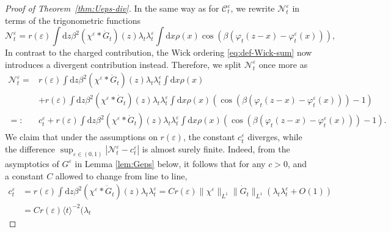 \documentclass[11pt, a4paper]{scrartcl}
\numberwithin{equation}{section}
\theoremstyle{plain}
\theoremstyle{remark}
\newcommand{\backassign}{=:}
\newcommand{\mathd}{\mathrm{d}}
\newcommand{\tmtextbf}[1]{\text{{\bfseries{#1}}}}
\begin{document}
\begin{proof}[Proof of Theorem~\ref{thm:Ueps-div}]
	\tmtextbf{($\mathcal{N}^{\varepsilon}_t$).} In the same way as for
	$\mathcal{C}^{\varepsilon}_t$, we rewrite $\mathcal{N}^{\varepsilon}_t$ in
	terms of the trigonometric functions
	\[ \mathcal{N}^{\varepsilon}_t = r (\varepsilon) \int \mathd z \beta^2
		(\chi^{\varepsilon} \ast \dot{G}_t ) (z) \lambda_t
		\lambda_t^{\varepsilon} \int \mathd x \rho (x) \cos (\beta (\varphi_t (z
				- x) - \varphi_t^{\varepsilon} (x))), \]
	In contrast to the charged contribution, the Wick ordering
	\eqref{eq:def-Wick-sum} now introduces a divergent contribution instead.
	Therefore, we split $\mathcal{N}^{\varepsilon}_t$ once more as
	\[ \begin{aligned}
			\mathcal{N}^{\varepsilon}_t = & r (\varepsilon) \int \mathd z \beta^2
			(\chi^{\varepsilon} \ast \dot{G}_t ) (z) \lambda_t
			\lambda_t^{\varepsilon}  \int \mathd x \rho (x)                                                  \\
			                              & + r (\varepsilon) \int \mathd z \beta^2 (\chi^{\varepsilon} \ast
			\dot{G}_t ) (z) \lambda_t \lambda_t^{\varepsilon} \int \mathd x \rho
			(x) (\cos (\beta (\varphi_t (z - x) - \varphi_t^{\varepsilon} (x))) -
			1)                                                                                               \\
			\backassign                   & c^{\varepsilon}_t + r (\varepsilon) \int \mathd z
			\beta^2 (\chi^{\varepsilon} \ast \dot{G}_t ) (z) \lambda_t
			\lambda_t^{\varepsilon} \int \mathd x \rho (x) (\cos (\beta (\varphi_t
						(z - x) - \varphi_t^{\varepsilon} (x))) - 1) .
		\end{aligned} \]
	We claim that under the assumptions on $r (\varepsilon)$, the constant
	$c^{\varepsilon}_t$ diverges, while the difference $\sup_{\varepsilon \in (0, 1)} |
		\mathcal{N}^{\varepsilon}_t - c_t^{\varepsilon} |$ is almost surely finite.
	Indeed, from the asymptotics of $G^{\varepsilon}$ in Lemma \ref{lem:Geps}
	below, it follows that for any $c > 0$, and a constant $C$ allowed to change
	from line to line,
	\[ \begin{aligned}
			c_t^{\varepsilon} & = r (\varepsilon) \int \mathd z \beta^2
			(\chi^{\varepsilon} \ast \dot{G}_t ) (z) \lambda_t
			\lambda_t^{\varepsilon} = Cr (\varepsilon) \| \chi^{\varepsilon}
			\|_{L^1} \| \dot{G}_t \|_{L^1}  (\lambda_t \lambda_t^{\varepsilon} + O
			(1))                                                                       \\
			                  & = Cr (\varepsilon) \langle t \rangle^{- 2}  (\lambda_t

\end{aligned}\]
\end{proof}
\end{document}
